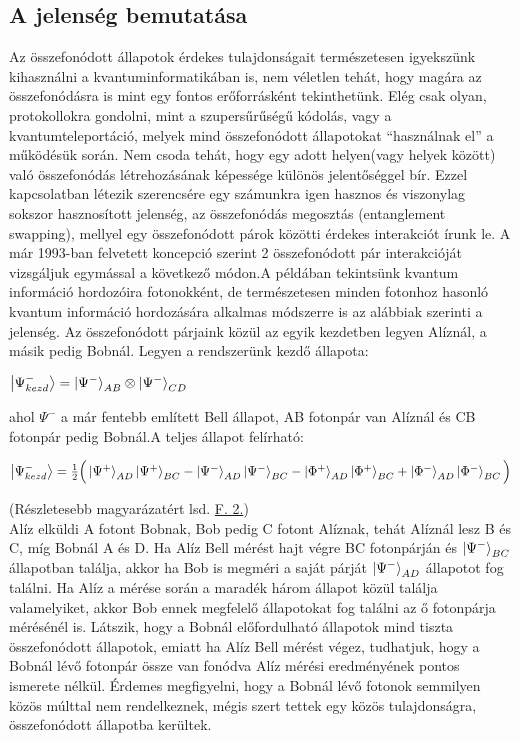 \subsection{A jelenség bemutatása}
Az összefonódott állapotok érdekes tulajdonságait természetesen igyekszünk kihasználni a kvantuminformatikában is, nem véletlen tehát, hogy magára az összefonódásra is mint egy fontos erőforrásként tekinthetünk. Elég csak olyan, protokollokra gondolni, mint a szupersűrűségű kódolás, vagy a kvantumteleportáció, melyek mind összefonódott állapotokat “használnak el” a működésük során. Nem csoda tehát, hogy egy adott helyen(vagy helyek között) való összefonódás létrehozásának képessége különös jelentőséggel bír. Ezzel kapcsolatban létezik szerencsére egy számunkra igen hasznos és viszonylag sokszor hasznosított jelenség, az összefonódás megosztás (entanglement swapping), mellyel egy összefonódott párok közötti érdekes interakciót írunk le. A már 1993-ban felvetett koncepció szerint \cite{zukowski1993event} 2 összefonódott pár interakcióját vizsgáljuk egymással a következő módon.A példában tekintsünk kvantum információ hordozóira fotonokként, de természetesen minden fotonhoz hasonló kvantum információ hordozására alkalmas módszerre is az alábbiak szerinti a jelenség. Az összefonódott párjaink közül az egyik kezdetben legyen Alíznál, a másik pedig Bobnál. Legyen a rendszerünk kezdő állapota:
\begin{center}
$ \ket{\Psi_{kezd}^-}= \ket{\Psi^-}_{AB} \otimes \ket{\Psi^-}_{CD} $
\end{center}
ahol $ \Psi^- $ a már fentebb említett Bell állapot, AB fotonpár van Alíznál és CB fotonpár pedig Bobnál.A teljes állapot felírható:
\begin{center}
$ \ket{\Psi_{kezd}^-} = \frac{1}{2} \Big( \ket{\Psi^+}_{AD}\ket{\Psi^+}_{BC}-\ket{\Psi^-}_{AD}\ket{\Psi^-}_{BC} - \ket{\Phi^+}_{AD}\ket{\Phi^+}_{BC}+\ket{\Phi^-}_{AD}\ket{\Phi^-}_{BC} \Big) $
\end{center}
(Részletesebb magyarázatért lsd. \hyperref[osszfonmeg]{F. 2.})\\
Alíz elküldi A fotont Bobnak, Bob pedig C fotont Alíznak, tehát Alíznál lesz B és C, míg Bobnál A és D. Ha Alíz Bell mérést hajt végre BC fotonpárján és $ \ket{\Psi^-}_{BC} $  állapotban találja, akkor ha Bob is megméri a saját párját $ \ket{\Psi^-}_{AD} $ állapotot fog találni. Ha Alíz a mérése során a maradék három állapot közül találja valamelyiket, akkor Bob ennek megfelelő állapotokat fog találni az ő fotonpárja mérésénél is. Látszik, hogy a Bobnál előfordulható állapotok mind tiszta összefonódott állapotok, emiatt ha Alíz Bell mérést végez, tudhatjuk, hogy a Bobnál lévő fotonpár össze van fonódva Alíz mérési eredményének pontos ismerete nélkül. Érdemes megfigyelni, hogy a Bobnál lévő fotonok semmilyen közös múlttal nem rendelkeznek, mégis szert tettek egy közös tulajdonságra, összefonódott állapotba kerültek.

